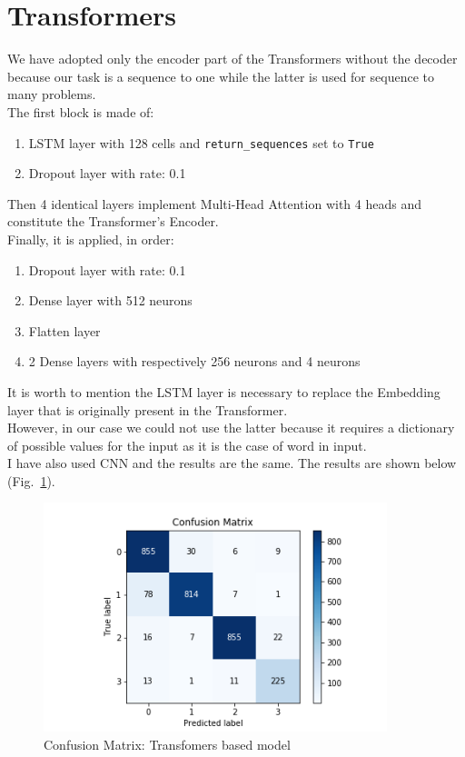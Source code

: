 \documentclass[LaM,binding=0.6cm]{sapthesis}
\begin{document}
\section{Transformers}
We have adopted only the encoder part of the Transformers without the decoder because our task is a sequence to one while the latter is used for sequence to many problems.\\The first block is made of:
\begin{enumerate}
\item LSTM layer with 128 cells and \texttt{return\_sequences} set to \texttt{True}
\item Dropout layer with rate: 0.1
\end{enumerate}
Then 4 identical layers implement Multi-Head Attention with 4 heads and constitute the Transformer's Encoder.\\Finally, it is applied, in order:
\begin{enumerate}
\item Dropout layer with rate: 0.1
\item Dense layer with 512 neurons
\item Flatten layer
\item 2 Dense layers with respectively 256 neurons and 4 neurons
\end{enumerate}
It is worth to mention the LSTM layer is necessary to replace the Embedding layer that is originally present in the Transformer.\\However, in our case we could not use the latter because it requires a dictionary of possible values for the input as it is the case of word in input.\\I have also used CNN and the results are the same.
The results are shown below (Fig.~\ref{fig:transf}).
\begin{figure}[H]  \centering
    \includegraphics[width=100mm,scale=0.7]{transf}
    \caption{Confusion Matrix: Transfomers based model }
    \label{fig:transf}
\end{figure}
\end{document}
